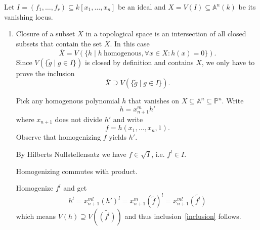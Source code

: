 \newcommand{\sheet}{2}




\maketitle

\begin{exercise}{1}
    Let $I = (f_1, \dots, f_r) \subseteq k[x_1, \dots, x_n]$ be an ideal and $X
    = V(I) \subseteq \mathbb{A}^n(k)$ be its vanishing locus.
    \begin{enumerate}
        \item{} Closure of a subset $X$ in a topological space is an
            intersection of all closed subsets that contain the set $X$. In this
            case
            \[
                \overline{X} = V(\{h \mid h\ \text{homogenous}, \forall x \in X
                \colon h(x) = 0\}).
            \]
            Since $V(\{ \widetilde{g} \mid g \in I \})$ is closed by
            definition and contains $X$, we only have to prove the inclusion
            \begin{equation}\label{inclusion}
                \overline{X} \supseteq V(\{ \tilde{g} \mid g \in I \}).
            \end{equation}

            Pick any homogenous polynomial $h$ that vanishes on $X \subseteq \mathbb{A}^n
            \subseteq \mathbb{P}^n$. Write
            \[
                h = x^m_{n+1} h'
            \]
            where $x_{n+1}$ does not divide $h'$ and write
            \[
                f = h(x_1, \dots, x_n, 1).
            \]
            Observe that homogenizing $f$ yields $h'$.

            By Hilberts Nullstellensatz we have $f \in \sqrt{I}$, i.e. $f^l \in
            I$.

            \begin{claim}
                Homogenizing commutes with product.
            \end{claim}
            \begin{proof_claim}
            \end{proof_claim}

            Homogenize $f^l$ and get
            \[
                h^l = x^{ml}_{n+1} (h')^l = x^m_{n+1} (\widetilde{f})^l = 
                x^{ml}_{n+1} \widetilde{(f^l)}
            \]
            which means $V(h) \supseteq V\left(\widetilde{(f^l)}\right)$ and thus
            inclusion~\ref{inclusion} follows.




\end{enumerate}
\end{exercise}
